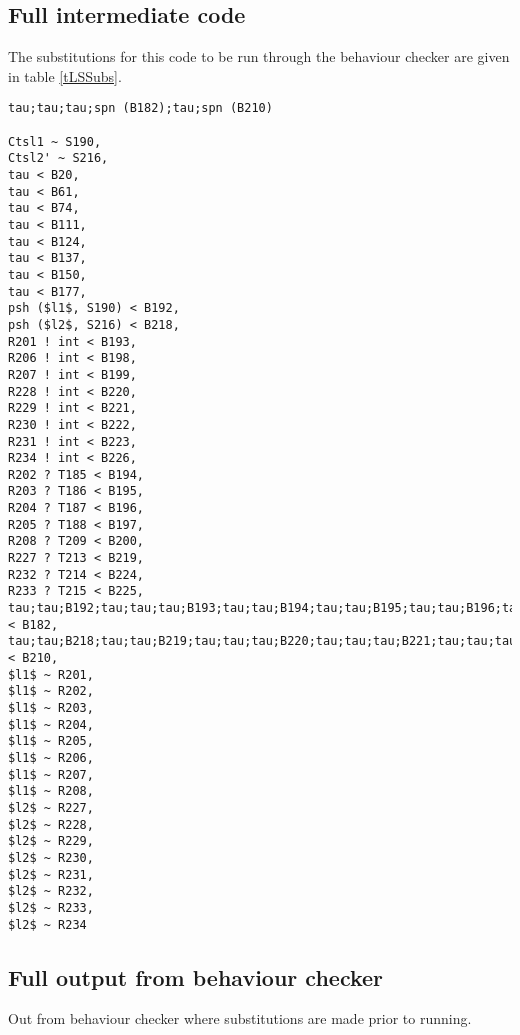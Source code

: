 \subsection*{Full intermediate code}
The substitutions for this code to be run through the behaviour checker are given in table \ref{tLSSubs}.

\begin{lstlisting}
tau;tau;tau;spn (B182);tau;spn (B210)

Ctsl1 ~ S190,
Ctsl2' ~ S216,
tau < B20,
tau < B61,
tau < B74,
tau < B111,
tau < B124,
tau < B137,
tau < B150,
tau < B177,
psh ($l1$, S190) < B192,
psh ($l2$, S216) < B218,
R201 ! int < B193,
R206 ! int < B198,
R207 ! int < B199,
R228 ! int < B220,
R229 ! int < B221,
R230 ! int < B222,
R231 ! int < B223,
R234 ! int < B226,
R202 ? T185 < B194,
R203 ? T186 < B195,
R204 ? T187 < B196,
R205 ? T188 < B197,
R208 ? T209 < B200,
R227 ? T213 < B219,
R232 ? T214 < B224,
R233 ? T215 < B225,
tau;tau;B192;tau;tau;tau;B193;tau;tau;B194;tau;tau;B195;tau;tau;B196;tau;tau;B197;tau;tau;tau;B198;tau;tau;tau;B199;tau;tau;B200 < B182,
tau;tau;B218;tau;tau;B219;tau;tau;tau;B220;tau;tau;tau;B221;tau;tau;tau;B222;tau;tau;tau;B223;tau;tau;B224;tau;tau;B225;tau;tau;tau;B226 < B210,
$l1$ ~ R201,
$l1$ ~ R202,
$l1$ ~ R203,
$l1$ ~ R204,
$l1$ ~ R205,
$l1$ ~ R206,
$l1$ ~ R207,
$l1$ ~ R208,
$l2$ ~ R227,
$l2$ ~ R228,
$l2$ ~ R229,
$l2$ ~ R230,
$l2$ ~ R231,
$l2$ ~ R232,
$l2$ ~ R233,
$l2$ ~ R234

\end{lstlisting}


\subsection*{Full output from behaviour checker}
Out from behaviour checker where substitutions are made prior to running.

